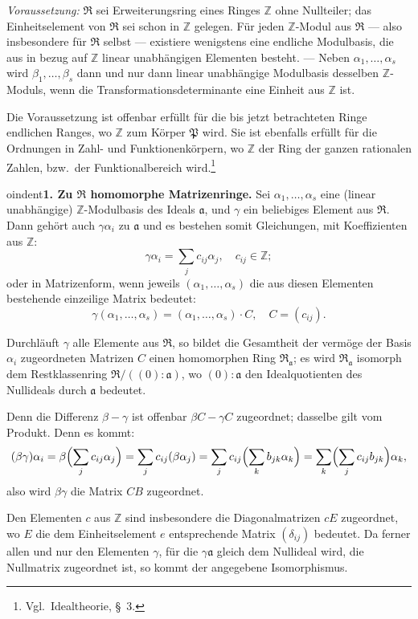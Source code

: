 \documentclass[12pt,a4paper]{article}
\newcommand{\mf}[1]{\mathfrak{#1}}     %
\newcommand{\ideala}{\mathfrak{a}}
\newcommand{\PP}{\mathfrak{P}}          %
\newcommand{\ZZ}{\mathbb{Z}}            %
\theoremstyle{definition}
\begin{document}
\textit{Voraussetzung:} $\mf{R}$ sei Erweiterungsring eines Ringes $\ZZ$ ohne
Nullteiler; das Einheitselement von $\mf{R}$ sei schon in $\ZZ$ gelegen.
F\"ur jeden $\ZZ$-Modul aus $\mf{R}$ --- also insbesondere f\"ur $\mf{R}$ selbst
--- existiere wenigstens eine endliche Modulbasis, die aus in bezug auf
$\ZZ$ linear unabh\"angigen Elementen besteht. --- Neben
$\alpha_1,\dots,\alpha_s$ wird $\beta_1,\dots,\beta_s$ dann und nur dann linear
unabh\"angige Modulbasis desselben $\ZZ$-Moduls, wenn die
Transformationsdeterminante eine Einheit aus $\ZZ$ ist.

Die Voraussetzung ist offenbar erf\"ullt f\"ur die bis jetzt betrachteten
Ringe endlichen Ranges, wo $\ZZ$ zum K\"orper $\PP$ wird. Sie ist
ebenfalls erf\"ullt f\"ur die Ordnungen in Zahl- und Funktionenk\"orpern, wo
$\ZZ$ der Ring der ganzen rationalen Zahlen, bzw.\ der Funktionalbereich
wird.\footnote{Vgl.\ Idealtheorie, \S~3.}

\medskip



oindent\textbf{1. Zu $\mf{R}$ homomorphe Matrizenringe.} Sei
$\alpha_1,\dots,\alpha_s$ eine (linear unabh\"angige) $\ZZ$-Modulbasis des Ideals
$\ideala$, und $\gamma$ ein beliebiges Element aus $\mf{R}$. Dann geh\"ort auch
$\gamma\alpha_i$ zu $\ideala$ und es bestehen somit Gleichungen, mit
Koeffizienten aus $\ZZ$:
\[
\gamma\alpha_i = \sum_j c_{ij}\alpha_j, \quad c_{ij} \in \ZZ;
\]
oder in Matrizenform, wenn jeweils $(\alpha_1,\dots,\alpha_s)$ die aus diesen
Elementen bestehende einzeilige Matrix bedeutet:
\[
\gamma(\alpha_1,\dots,\alpha_s) = (\alpha_1,\dots,\alpha_s) \cdot C,
\quad C = (c_{ij}).
\]

Durchl\"auft $\gamma$ alle Elemente aus $\mf{R}$, so bildet die Gesamtheit der
verm\"oge der Basis $\alpha_i$ zugeordneten Matrizen $C$ einen homomorphen
Ring $\mf{R}_{\ideala}$; es wird $\mf{R}_{\ideala}$ isomorph dem Restklassenring
$\mf{R}/((0):\ideala)$, wo $(0):\ideala$ den Idealquotienten des Nullideals
durch $\ideala$ bedeutet.

Denn die Differenz $\beta-\gamma$ ist offenbar $\beta C - \gamma C$ zugeordnet;
dasselbe gilt vom Produkt. Denn es kommt:
\[
(\beta\gamma)\alpha_i = \beta\Bigl(\sum_j c_{ij}\alpha_j\Bigr)
= \sum_j c_{ij}(\beta\alpha_j)
= \sum_j c_{ij}\Bigl(\sum_k b_{jk}\alpha_k\Bigr)
= \sum_k \Bigl(\sum_j c_{ij}b_{jk}\Bigr)\alpha_k,
\]
also wird $\beta\gamma$ die Matrix $CB$ zugeordnet.

Den Elementen $c$ aus $\ZZ$ sind insbesondere die Diagonalmatrizen $cE$
zugeordnet, wo $E$ die dem Einheitselement $e$ entsprechende Matrix
$(\delta_{ij})$ bedeutet. Da ferner allen und nur den Elementen $\gamma$,
f\"ur die $\gamma\ideala$ gleich dem Nullideal wird, die Nullmatrix zugeordnet
ist, so kommt der angegebene Isomorphismus.
\end{document}

